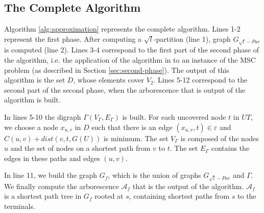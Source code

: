 \subsection{The Complete Algorithm}
\label{sec:complete_algorithm}

Algorithm \ref{alg:approximation} represents the complete algorithm. Lines 1-2 represent the first phase.
After computing a $\sqrt{l}$-partition (line 1), graph $G_{\sqrt{l}-Par}$ is computed (line 2).
Lines 3-4 correspond to the first part of the second phase of the algorithm, i.e. the application of the algorithm in \cite{Chekuri2004} to an instance of the MSC problem
(as described in Section \ref{sec:second-phase}). 
The output of this algorithm is the set $D$, whose elements cover $V_2$. 
Lines 5-12 correspond to the second part of the second phase, when the arborescence that is output of the algorithm is built.

In lines 5-10 the digraph $\varGamma(V_{\varGamma},E_{\varGamma})$ is built. For each uncovered node $t$ in $UT$, we choose a node $x_{u, v}$ in $D$
such that there is an edge $(x_{u, v}, t) \in \varepsilon$ and $C(u, v) + dist(v,t,G(U))$ is minimum. The set $V_\varGamma$ is composed of the nodes $u$ and the set of nodes on a shortest path
from $v$ to $t$. The set $E_\varGamma$ contains the edges in these paths and edges $(u, v)$.

In line 11, we build the graph $G_f$, which is the union of graphs $G_{\sqrt{l}-Par}$ and $\varGamma$. 
We finally compute the arborescence $\mathcal{A}_f$ that is the output of the algorithm. $\mathcal{A}_f$ is a shortest
path tree in $G_f$ rooted at $s$, containing shortest paths from $s$ to the terminals. 


